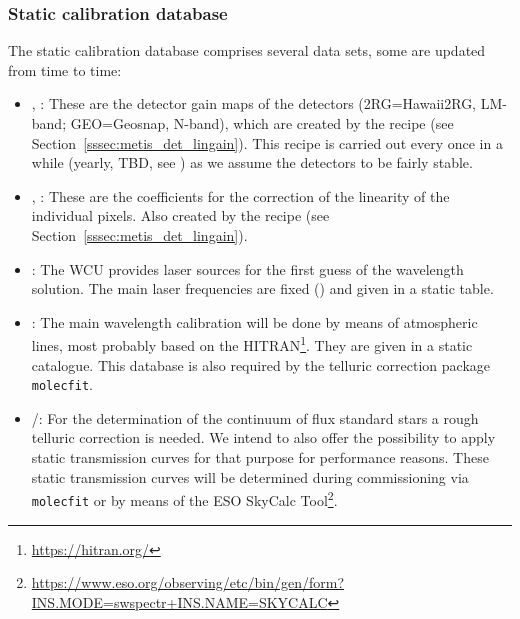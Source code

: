 \restoregeometry

\subsubsection{Static calibration database}\label{lss:static_calib}
The static calibration database comprises several data sets, some are updated from time to time:
\begin{itemize}
    \item \hyperref[dataitem:gain_map_2rg]{}, \hyperref[dataitem:gain_map_geo]{}: These are the detector gain maps of the detectors (2RG=Hawaii2RG, LM-band; GEO=Geosnap, N-band), which are created by the recipe \hyperref[sssec:metis_det_lingain]{} (see Section~\ref{sssec:metis_det_lingain}). This recipe is carried out every once in a while (yearly, TBD, see \cite{METIS-calibration_plan}) as we assume the detectors to be fairly stable.
    \item \hyperref[dataitem:linearity_2rg]{}, \hyperref[dataitem:linearity_geo]{}: These are the coefficients for the correction of the linearity of the individual pixels. Also created by the recipe \hyperref[sssec:metis_det_lingain]{} (see Section~\ref{sssec:metis_det_lingain}). 
    \item \hyperref[dataitem:laser_tab]{}: The \ac{WCU} provides laser sources for the first guess of the wavelength solution. The main laser frequencies are fixed (\cite{METIS-calibration_plan}) and given in a static table.
    \item \hyperref[dataitem:atm_line_cat]{}: The main wavelength calibration will be done by means of atmospheric lines, most probably based on the \ac{HITRAN}\footnote{\url{https://hitran.org/}}. They are given in a static catalogue. This database is also required by the telluric correction package \texttt{molecfit}.
    \item \hyperref[dataitem:lm_synth_trans]{}/\hyperref[dataitem:n_synth_trans]{}: For the determination of the continuum of flux standard stars a rough telluric correction is needed. We intend to also offer the possibility to apply static transmission curves for that purpose for performance reasons. These static transmission curves will be determined during commissioning via \texttt{molecfit} or by means of the ESO SkyCalc Tool\footnote{\url{https://www.eso.org/observing/etc/bin/gen/form?INS.MODE=swspectr+INS.NAME=SKYCALC}}.

\end{itemize}

